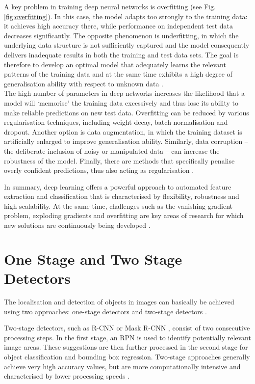 A key problem in training deep neural networks is overfitting (see Fig. \ref{fig:overfitting}). In this case, the model adapts too strongly to the training data: it achieves high accuracy there, while performance on independent test data decreases significantly. The opposite phenomenon is underfitting, in which the underlying data structure is not sufficiently captured and the model consequently delivers inadequate results in both the training and test data sets. The goal is therefore to develop an optimal model that adequately learns the relevant patterns of the training data and at the same time exhibits a high degree of generalisation ability with respect to unknown data \cite{overfitting_pic}.\\
The high number of parameters in deep networks increases the likelihood that a model will ‘memorise’ the training data excessively and thus lose its ability to make reliable predictions on new test data. Overfitting can be reduced by various regularisation techniques, including weight decay, batch normalisation and dropout. Another option is data augmentation, in which the training dataset is artificially enlarged to improve generalisation ability. Similarly, data corruption – the deliberate inclusion of noisy or manipulated data – can increase the robustness of the model. Finally, there are methods that specifically penalise overly confident predictions, thus also acting as regularisation \cite{Alzubaidi2021}.

In summary, deep learning offers a powerful approach to automated feature extraction and classification that is characterised by flexibility, robustness and high scalability. At the same time, challenges such as the vanishing gradient problem, exploding gradients and overfitting are key areas of research for which new solutions are continuously being developed \cite{Alzubaidi2021}.
 








\section{One Stage and Two Stage Detectors}

The localisation and detection of objects in images can basically be achieved using two approaches: one-stage detectors and two-stage detectors \cite{Soviany2018}.

Two-stage detectors, such as \Acrfull{R-CNN} \cite{ren2016} or Mask \acrshort{R-CNN} \cite{he2018}, consist of two consecutive processing steps. In the first stage, an \Acrfull{RPN} is used to identify potentially relevant image areas. These suggestions are then further processed in the second stage for object classification and bounding box regression. Two-stage approaches generally achieve very high accuracy values, but are more computationally intensive and characterised by lower processing speeds \cite{Soviany2018}.

